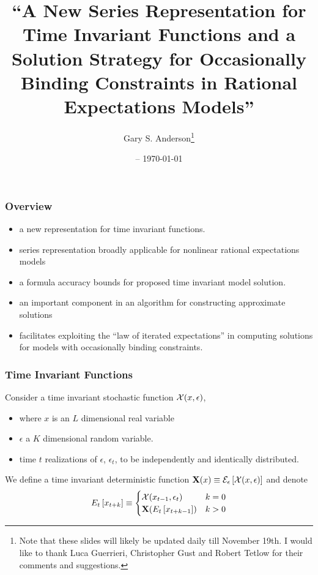 \documentclass{beamer}
\title{``A New Series Representation for Time Invariant Functions and
a Solution Strategy for Occasionally Binding Constraints in Rational Expectations Models''}
\date{\currenttime -- \today }
\author{Gary S. Anderson\thanks{Note that these slides will likely be updated daily till November 19th. I would like to thank Luca Guerrieri, Christopher Gust and Robert Tetlow for their comments and suggestions. }}
\begin{document}
\begin{frame}
  \titlepage
\end{frame}

\begin{frame}
  \frametitle{Overview}
  \begin{itemize}
  \item  a new representation for time invariant functions.
  \item  series representation broadly applicable for nonlinear rational expectations models 
\item a formula  accuracy bounds for proposed time invariant model solution.
\item an important component in an algorithm for constructing approximate solutions 
\item facilitates exploiting the ``law of iterated expectations'' in computing solutions for models with occasionally binding constraints.
  \end{itemize}
\end{frame}

\begin{frame}
  \frametitle{Time Invariant Functions}

Consider a time invariant stochastic function $\mathcal{X}(x,\epsilon)$, 
\begin{itemize}
\item where $x$ is an $L$ dimensional real variable
\item $\epsilon$ a $K$ dimensional random variable.
\item time $t$ realizations of $\epsilon$, $\epsilon_t$, to be independently and identically distributed.
\end{itemize}
We define a time invariant deterministic function $\mathbf{X}(x)\equiv \mathcal{E}_{\epsilon} \left [\mathcal{X}(x,\epsilon) \right ]$ and denote
\begin{gather*}
E_{t} \left [x_{t+k} \right ]\equiv\begin{cases}
\mathcal{X}{(x_{t-1},\epsilon_t)} &k=0\\
\mathbf{X}{(E_{t} \left [x_{t+k-1} \right ])} &k>0
\end{cases}
\end{gather*}

\end{frame}
\end{document}
